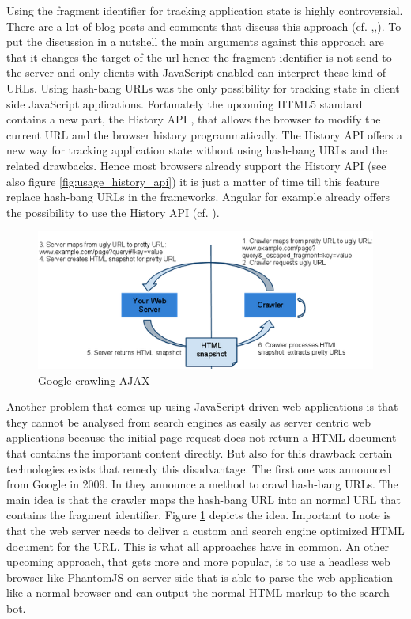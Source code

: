 Using the fragment identifier for tracking application state is highly controversial.
There are a lot of blog posts and comments that discuss this approach (cf.
\autocite[]{hashbang_urls_1},\autocite[]{hashbang_urls_2},\autocite[]{hashbang_urls_3}).
To put the discussion in a nutshell the main arguments against this approach are that it changes the target of the url hence the fragment identifier is not send to the server and only clients with JavaScript enabled can interpret these kind of URLs.
Using hash-bang URLs was the only possibility for tracking state in client side JavaScript applications.
Fortunately the upcoming HTML5 standard contains a new part, the History API \autocite[]{w3c-history-api}, that allows the browser to modify the current URL and the browser history programmatically.
The History API offers a new way for tracking application state without using hash-bang URLs and the related drawbacks.
Hence most browsers already support the History API (see also figure \ref{fig:usage_history_api}) it is just a matter of time till this feature replace hash-bang URLs in the frameworks.
Angular for example already offers the possibility to use the History API (cf.
\autocite[]{angular_location}).

\begin{figure}
	\centering \includegraphics[width=1.0\textwidth]{./img/web-dev/google_crawling_hashbang.png}
	\caption{Google crawling AJAX \autocite{google_AJAX_crawling}}
	\label{fig:google_crawling_ajax}
\end{figure}

Another problem that comes up using JavaScript driven web applications is that they cannot be analysed from search engines as easily as server centric web applications because the initial page request does not return a HTML document that contains the important content directly.
But also for this drawback certain technologies exists that remedy this disadvantage.
The first one was announced from Google in 2009.
In \autocite[]{google_AJAX_crawling} they announce a method to crawl hash-bang URLs.
The main idea is that the crawler maps the hash-bang URL into an normal URL that contains the fragment identifier.
Figure \ref{fig:google_crawling_ajax} depicts the idea.
Important to note is that the web server needs to deliver a custom and search engine optimized HTML document for the URL.
This is what all approaches have in common.
An other upcoming approach, that gets more and more popular, is to use a headless web browser like PhantomJS on server side that is able to parse the web application like a normal browser and can output the normal HTML markup to the search bot.